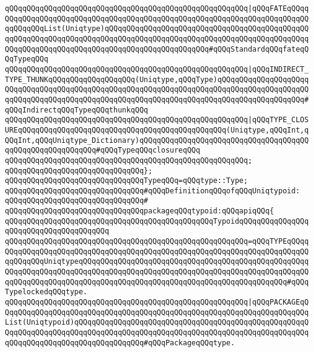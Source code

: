 \verb|qQQqqQQqqQQqqQQqqQQqqQQqqQQqqQQqqQQqqQQqqQQqqQQqqQQqqQQq|\verb#|qQQqFATEqQQqqQQqqQQqqQQqqQQqqQQqqQQqqQQqqQQqqQQqqQQqqQQqqQQqqQQqqQQqqQQqqQQqqQQqqQQqqQQqqQQqList(Uniqtype)qQQqqQQqqQQqqQQqqQQqqQQqqQQqqQQqqQQqqQQqqQQqqQQqqQQqqQQqqQQqqQQqqQQqqQQqqQQqqQQqqQQqqQQqqQQqqQQqqQQqqQQqqQQqqQQqqQQqqQQqqQQqqQQqqQQqqQQqqQQqqQQqqQQqqQQqqQQqqQQqqQQq#\verb|#qQQqStandardqQQqfateqQQqTypeqQQq|\newline
\verb|qQQqqQQqqQQqqQQqqQQqqQQqqQQqqQQqqQQqqQQqqQQqqQQqqQQqqQQq|\verb#|qQQqINDIRECT_TYPE_THUNKqQQqqQQqqQQqqQQqqQQq(Uniqtype,qQQqType)qQQqqQQqqQQqqQQqqQQqqQQqqQQqqQQqqQQqqQQqqQQqqQQqqQQqqQQqqQQqqQQqqQQqqQQqqQQqqQQqqQQqqQQqqQQqqQQqqQQqqQQqqQQqqQQqqQQqqQQqqQQqqQQqqQQqqQQqqQQqqQQqqQQqqQQqqQQqqQQq#\verb|#qQQqIndirectqQQqTypeqQQqthunkqQQq|\newline
\verb|qQQqqQQqqQQqqQQqqQQqqQQqqQQqqQQqqQQqqQQqqQQqqQQqqQQqqQQq|\verb#|qQQqTYPE_CLOSUREqQQqqQQqqQQqqQQqqQQqqQQqqQQqqQQqqQQqqQQqqQQqqQQq(Uniqtype,qQQqInt,qQQqInt,qQQqUniqtype_Dictionary)qQQqqQQqqQQqqQQqqQQqqQQqqQQqqQQqqQQqqQQqqQQqqQQqqQQqqQQqqQQq#\verb|#qQQqTypeqQQqclosureqQQq|\newline
\verb|qQQqqQQqqQQqqQQqqQQqqQQqqQQqqQQqqQQqqQQqqQQqqQQqqQQqqQQq;|\newline
\verb|qQQqqQQqqQQqqQQqqQQqqQQqqQQqqQQq};|\newline
\verb|qQQqqQQqqQQqqQQqqQQqqQQqqQQqqQQqTypeqQQq=qQQqtype::Type;|\newline
\newline
\verb|qQQqqQQqqQQqqQQqqQQqqQQqqQQqqQQq#qQQqDefinitionqQQqofqQQqUniqtypoid:|\newline
\verb|qQQqqQQqqQQqqQQqqQQqqQQqqQQqqQQq#|\newline
\verb|qQQqqQQqqQQqqQQqqQQqqQQqqQQqqQQqpackageqQQqtypoid:qQQqapiqQQq{|\newline
\verb|qQQqqQQqqQQqqQQqqQQqqQQqqQQqqQQqqQQqqQQqqQQqqQQqTypoidqQQqqQQqqQQqqQQqqQQqqQQqqQQqqQQqqQQqqQQq|\newline
\verb|qQQqqQQqqQQqqQQqqQQqqQQqqQQqqQQqqQQqqQQqqQQqqQQqqQQqqQQq=qQQqTYPEqQQqqQQqqQQqqQQqqQQqqQQqqQQqqQQqqQQqqQQqqQQqqQQqqQQqqQQqqQQqqQQqqQQqqQQqqQQqqQQqqQQqUniqtypeqQQqqQQqqQQqqQQqqQQqqQQqqQQqqQQqqQQqqQQqqQQqqQQqqQQqqQQqqQQqqQQqqQQqqQQqqQQqqQQqqQQqqQQqqQQqqQQqqQQqqQQqqQQqqQQqqQQqqQQqqQQqqQQqqQQqqQQqqQQqqQQqqQQqqQQqqQQqqQQqqQQqqQQqqQQqqQQqqQQqqQQqqQQq#qQQqTypelockedqQQqtype.|\newline
\verb|qQQqqQQqqQQqqQQqqQQqqQQqqQQqqQQqqQQqqQQqqQQqqQQqqQQqqQQq|\verb#|qQQqPACKAGEqQQqqQQqqQQqqQQqqQQqqQQqqQQqqQQqqQQqqQQqqQQqqQQqqQQqqQQqqQQqqQQqqQQqqQQqList(Uniqtypoid)qQQqqQQqqQQqqQQqqQQqqQQqqQQqqQQqqQQqqQQqqQQqqQQqqQQqqQQqqQQqqQQqqQQqqQQqqQQqqQQqqQQqqQQqqQQqqQQqqQQqqQQqqQQqqQQqqQQqqQQqqQQqqQQqqQQqqQQqqQQqqQQqqQQqqQQqqQQq#\verb|#qQQqPackageqQQqtype.|\newline
